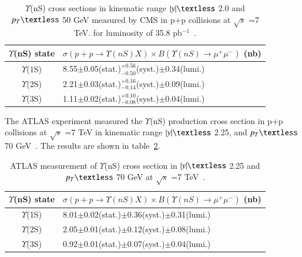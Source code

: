 \begin{table}
  \begin{center}
    \caption[]{ $\Upsilon$(nS) cross sections
  in kinematic range $|y|\textless$ 2.0 and $p_{T}\textless$ 50 GeV 
      measured by CMS in p+p collisions at $\surd s$ =7 TeV.
  for luminosity of 35.8 pb$^{-1}$~\cite{CMS:2015xqv}.}
\label{Tab:CMSYCrossPLB}
\begin{tabular}{cl} 
\hline 
\hline
$\Upsilon$(nS) state             &$ \sigma(p+p \rightarrow \Upsilon(nS)X) \times B(\Upsilon(nS)\rightarrow\mu^{+}\mu^{-})$ (nb)    \\              
\hline
$\Upsilon$(1S)                   &8.55$\pm$0.05(stat.)$^{+0.56}_{-0.50}$(syst.)$\pm$0.34(lumi.)\\
$\Upsilon$(2S)                   &2.21$\pm$0.03(stat.)$^{+0.16}_{-0.14}$(syst.)$\pm$0.09(lumi.)\\
$\Upsilon$(3S)                   &1.11$\pm$0.02(stat.)$^{+0.10}_{-0.08}$(syst.)$\pm$0.04(lumi.)\\
\hline
\hline
\end{tabular}
\end{center}
\end{table}


The ATLAS experiment measured the $\Upsilon$(nS) production cross section
in p+p collisions at $\surd s$ =7 TeV in kinematic range $|y|\textless$ 2.25,
and $p_{T}\textless$ 70 GeV~\cite{ATLAS:2012lmu}.  
The results are shown in table~\ref{Tab:ATLASYCross}.


\begin{table}
  \begin{center}
    \caption[]{ATLAS measurement of $\Upsilon$(nS) cross section in $|y|\textless$ 2.25 and $p_{T}\textless$ 70 GeV
      at $\surd s$ =7 TeV~\cite{ATLAS:2012lmu}.}
\label{Tab:ATLASYCross}
\begin{tabular}{cl} 
\hline 
\hline
$\Upsilon$(nS) state             &$ \sigma(p+p \rightarrow \Upsilon(nS)X) \times B(\Upsilon(nS)\rightarrow\mu^{+}\mu^{-})$ (nb)    \\              
\hline
$\Upsilon$(1S)                   &8.01$\pm$0.02(stat.)$\pm$0.36(syst.)$\pm$0.31(lumi.)\\
$\Upsilon$(2S)                   &2.05$\pm$0.01(stat.)$\pm$0.12(syst.)$\pm$0.08(lumi.)\\
$\Upsilon$(3S)                   &0.92$\pm$0.01(stat.)$\pm$0.07(syst.)$\pm$0.04(lumi.)\\
\hline
\hline
\end{tabular}
\end{center}
\end{table}

